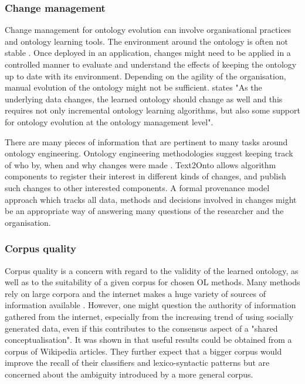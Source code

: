 \documentclass[a4paper]{report}
\begin{document}
\subsubsection{Change management}

Change management for ontology evolution can involve organisational practices and ontology learning tools.
The environment around the ontology is often not stable \cite{Blomqvist09Thesis}.
Once deployed in an application, changes might need to be applied in a controlled manner to evaluate and understand the effects of keeping the ontology up to date with its environment\cite{HOO2009OntEngMeth}.
Depending on the agility of the organisation, manual evolution of the ontology might not be sufficient\cite{Blomqvist09Thesis}.
\cite{Cimiano2009OL} states "As the underlying data changes, the learned ontology should change as well and this requires not only incremental ontology learning algorithms, but also some support for ontology evolution at the ontology management level".

There are many pieces of information that are pertinent to many tasks around ontology engineering.
Ontology engineering methodologies suggest keeping track of who by, when and why changes were made \cite{HOO2009OntEngMeth}.
Text2Onto allows algorithm components to register their interest in different kinds of changes, and publish such changes to other interested components\cite{Cimiano2005Text2Onto}.
A formal provenance model approach\citep{Groth09PipeProv} which tracks all data, methods and decisions involved in changes might be an appropriate way of answering many questions of the researcher and the organisation.

\subsubsection{Corpus quality}

Corpus quality is a concern with regard to the validity of the learned ontology, as well as to the suitability of a given corpus for chosen OL methods.
Many methods rely on large corpora\cite{Cimiano06} and the internet makes a huge variety of sources of information available \cite{Wong11Survey}.
However, one might question the authority of information gathered from the internet, especially from the increasing trend of using socially generated data, even if this contributes to the consensus aspect of a "shared conceptualisation"\cite{Wong11Survey}.
It was shown in \cite{Hjelm09Thesis} that useful results could be obtained from a corpus of Wikipedia articles.
They further expect that a bigger corpus would improve the recall of their classifiers and lexico-syntactic patterns but are concerned about the ambiguity introduced by a more general corpus\cite{Hjelm09Thesis}. 
\end{document}
